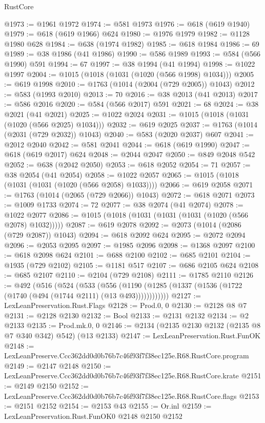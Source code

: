 \begin{lexlean}{RustCore}
\begin{coremodule}
@1973 := @1961 @1972
@1974 := @581 @1973
@1976 := @618 (@619 @1940)
@1979 := @618 (@619 @1966) @624
@1980 := @1976 @1979
@1982 := @1128 @1980 @628
@1984 := @638 (@1974 @1982)
@1985 := @618 @1984
@1986 := 69
@1989 := @38 @1986 (@41 @1986)
@1990 := @586 @1989
@1993 := @584 (@566 @1990) @591
@1994 := 67
@1997 := @38 @1994 (@41 @1994)
@1998 := @1022 @1997
@2004 := @1015 (@1018 (@1031 (@1020 (@566 @1998) @1034)))
@2005 := @619 @1998
@2010 := @1763 (@1014 (@2004 (@729 @2005)) @1043)
@2012 := @583 (@1993 @2010)
@2013 := 70
@2016 := @38 @2013 (@41 @2013)
@2017 := @586 @2016
@2020 := @584 (@566 @2017) @591
@2021 := 68
@2024 := @38 @2021 (@41 @2021)
@2025 := @1022 @2024
@2031 := @1015 (@1018 (@1031 (@1020 (@566 @2025) @1034)))
@2032 := @619 @2025
@2037 := @1763 (@1014 (@2031 (@729 @2032)) @1043)
@2040 := @583 (@2020 @2037) @607
@2041 := @2012 @2040
@2042 := @581 @2041
@2044 := @618 (@619 @1990)
@2047 := @618 (@619 @2017) @624
@2048 := @2044 @2047
@2050 := @849 @2048 @542
@2052 := @638 (@2042 @2050)
@2053 := @618 @2052
@2054 := 71
@2057 := @38 @2054 (@41 @2054)
@2058 := @1022 @2057
@2065 := @1015 (@1018 (@1031 (@1031 (@1020 (@566 @2058) @1033))))
@2066 := @619 @2058
@2071 := @1763 (@1014 (@2065 (@729 @2066)) @1043)
@2072 := @618 @2071
@2073 := @1009 @1733
@2074 := 72
@2077 := @38 @2074 (@41 @2074)
@2078 := @1022 @2077
@2086 := @1015 (@1018 (@1031 (@1031 (@1031 (@1020 (@566 @2078) @1032)))))
@2087 := @619 @2078
@2092 := @2073 (@1014 (@2086 (@729 @2087)) @1043)
@2094 := @618 @2092 @624
@2095 := @2072 @2094
@2096 := @2053 @2095
@2097 := @1985 @2096
@2098 := @1368 @2097
@2100 := @618 @2098 @624
@2101 := @688 @2100
@2102 := @685 @2101
@2104 := @1935 (@729 @2102)
@2105 := @1181 @517
@2107 := @686 @2105 @624
@2108 := @685 @2107
@2110 := @2104 (@729 @2108)
@2111 := @1785 @2110
@2126 := @492
    (@516
      (@524
        (@533
          (@556 (@1190 (@1285 (@1337 (@1536 (@1722 (@1740 (@494 (@1744 @2111) (@13 @493))))))))))))
@2127 := LexLeanPreservation.Rust.Flags
@2128 := Prod.{0, 0}
@2130 := @2128 @8 @7
@2131 := @2128 @2130
@2132 := Bool
@2133 := @2131 @2132
@2134 := @2 @2133
@2135 := Prod.mk.{0, 0}
@2146 := @2134 (@2135 @2130 @2132 (@2135 @8 @7 @340 @342) @542) (@13 @2133)
@2147 := LexLeanPreservation.Rust.FunOK
@2148 := LexLeanPreserve.Ccc362dd0d0b76b7c46f93f7f38ec125e.R68.RustCore.program
@2149 := @2147 @2148
@2150 := LexLeanPreserve.Ccc362dd0d0b76b7c46f93f7f38ec125e.R68.RustCore.krate
@2151 := @2149 @2150
@2152 := LexLeanPreserve.Ccc362dd0d0b76b7c46f93f7f38ec125e.R68.RustCore.flags
@2153 := @2151 @2152
@2154 := @2153 @43
@2155 := Or.inl
@2159 := LexLeanPreservation.Rust.FunOK0 @2148 @2150 @2152

\end{coremodule}
\end{lexlean}
